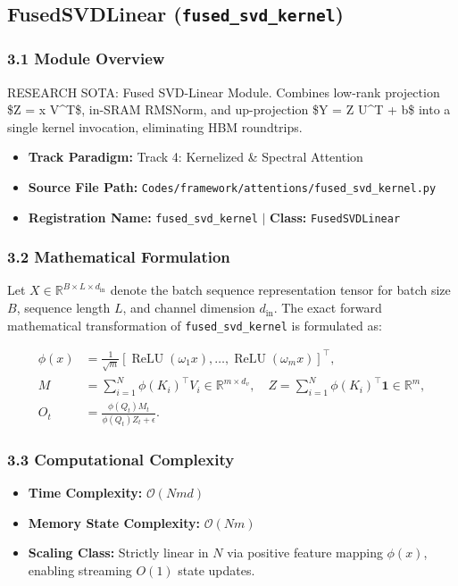 \subsection{FusedSVDLinear (\texttt{fused\_svd\_kernel})}
\label{sec:app_module_fused_svd_kernel}

\subsubsection*{3.1 Module Overview}
RESEARCH SOTA: Fused SVD-Linear Module. Combines low-rank projection \$Z = x V^T\$, in-SRAM RMSNorm, and up-projection \$Y = Z U^T + b\$ into a single kernel invocation, eliminating HBM roundtrips.
\begin{itemize}
    \item \textbf{Track Paradigm:} Track 4: Kernelized & Spectral Attention
    \item \textbf{Source File Path:} \texttt{Codes/framework/attentions/fused\_svd\_kernel.py}
    \item \textbf{Registration Name:} \texttt{fused\_svd\_kernel} $\mid$ \textbf{Class:} \texttt{FusedSVDLinear}
\end{itemize}

\subsubsection*{3.2 Mathematical Formulation}
Let $X \in \mathbb{R}^{B \times L \times d_{\text{in}}}$ denote the batch sequence representation tensor for batch size $B$, sequence length $L$, and channel dimension $d_{\text{in}}$. The exact forward mathematical transformation of \texttt{fused\_svd\_kernel} is formulated as:

\begin{align}
\phi(x) &= \frac{1}{\sqrt{m}} \left[ \operatorname{ReLU}(\omega_1 x), \dots, \operatorname{ReLU}(\omega_m x) \right]^\top, \\
M &= \sum_{i=1}^N \phi(K_i)^\top V_i \in \mathbb{R}^{m \times d_v}, \quad Z = \sum_{i=1}^N \phi(K_i)^\top \mathbf{1} \in \mathbb{R}^m, \\
O_t &= \frac{\phi(Q_t) M_t}{\phi(Q_t) Z_t + \epsilon}.
\end{align}


\subsubsection*{3.3 Computational Complexity}
\begin{itemize}
    \item \textbf{Time Complexity:} $\mathcal{O}(N m d)$
    \item \textbf{Memory State Complexity:} $\mathcal{O}(N m)$
    \item \textbf{Scaling Class:} Strictly linear in $N$ via positive feature mapping $\phi(x)$, enabling streaming $O(1)$ state updates.
\end{itemize}

